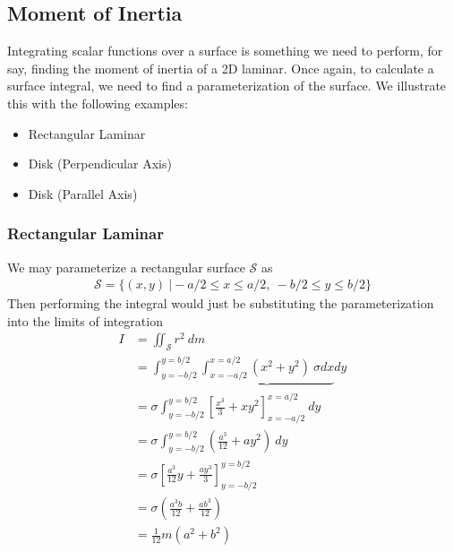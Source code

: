 \documentclass{article}
\begin{document}
\subsection{Moment of Inertia}
Integrating scalar functions over a surface is something we need to perform, for say, finding the moment of inertia of a 2D laminar. Once again, to calculate a surface integral, we need to find a parameterization of the surface. We illustrate this with the following examples:
\begin{itemize}
    \item Rectangular Laminar
    \item Disk (Perpendicular Axis)
    \item Disk (Parallel Axis)
\end{itemize}
\subsubsection{Rectangular Laminar}
We may parameterize a rectangular surface $\mathcal{S}$ as 
\begin{align}
\mathcal{S} = \{(x,y)\ \vert -a/2 \leq x \leq a/2,\ -b/2 \leq y \leq b/2 \}
\end{align}
Then performing the integral would just be substituting the parameterization into the limits of integration
\begin{align}
    I &= \iint_{\mathcal{S}} r^2\ dm \\
    &= \int_{y=-b/2}^{y=b/2} \underbrace{\int_{x=-a/2}^{x=a/2} (x^2 + y^2)\ \sigma dx}dy \\
    &= \sigma \int_{y=-b/2}^{y=b/2} \left[ \frac{x^3}{3} + xy^2 \right]^{x=a/2}_{x=-a/2} \ dy \\
    &= \sigma \int_{y=-b/2}^{y=b/2} \left( \frac{a^3}{12} + ay^2 \right)  \ dy\\
    &= \sigma \left[ \frac{a^3}{12}y + \frac{ay^3}{3} \right]^{y=b/2}_{y=-b/2} \\ 
    &= \sigma \left(\frac{a^3 b}{12} + \frac{a b^3}{12} \right) \\
    &= \frac{1}{12} m (a^2 + b^2)
\end{align}
\end{document}
